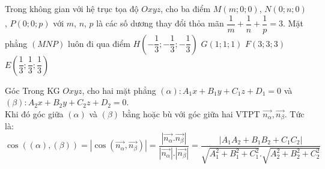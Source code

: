 \begin{ex}%
	Trong không gian với hệ trục tọa độ $Oxyz$, cho ba điểm $M(m;0;0)$, $N(0;n;0)$, $P(0;0;p)$ với $m$, $n$, $p$ là các số dương thay đổi thỏa mãn $\dfrac{1}{m}+\dfrac{1}{n}+\dfrac{1}{p}=3$. Mặt phẳng $(MNP)$ luôn đi qua điểm
	\choice
	{$H\left(-\dfrac{1}{3};-\dfrac{1}{3};-\dfrac{1}{3}\right)$}
	{$G(1;1;1)$}
	{$F(3;3;3)$}
	{\True $E\left(\dfrac{1}{3};\dfrac{1}{3};\dfrac{1}{3}\right)$}
\end{ex}



\begin{dang}{Góc}
Trong KG $Oxyz$, cho hai mặt phẳng $\left(\alpha\right):A_1x+B_1y+C_1z+D_1=0$ và $\left(\beta\right):A_2x+B_2y+C_2z+D_2=0 $.\\
Khi đó góc giữa $\left(\alpha\right)$ và $\left(\beta\right)$ bằng hoặc bù với góc giữa hai VTPT $\overrightarrow{n_{\alpha}},\overrightarrow{n_{\beta}}$. Tức là:\\
$$\boxed{ \cos\left(\left(\alpha\right),\left(\beta\right)\right)=\left|\cos\left(\overrightarrow{n_{\alpha}},\overrightarrow{n_\beta}\right)\right|=\dfrac{\left|\overrightarrow{n_{\alpha}}.\overrightarrow{n_{\beta}}\right|}{\left|\overrightarrow{n_{\alpha}}\right|.\left|\overrightarrow{n_{\beta}}\right|}=\dfrac{\left|A_1A_2+B_1B_2+C_1C_2\right|}{\sqrt{A_1^2+B_1^2+C_1^2}.\sqrt{A_2^2+B_2^2+C_2^2}}}$$
	
\end{dang}
\setcounter{subsubsection}{0}
\setcounter{vd}{0}
\setcounter{bt}{0}
\setcounter{ex}{0}
